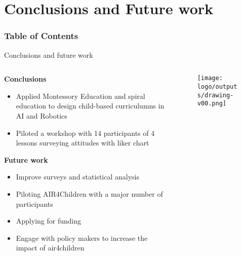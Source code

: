 \section{Conclusions and Future work}


\begin{frame}
      \frametitle{Table of Contents}
      \tableofcontents[currentsection]
\end{frame}



{
\begin{frame}{Conclusions and future work}

  \begin{columns}
  \begin{column}{.75\linewidth}

  \textbf{Conclusions}   

  \begin{itemize}
    \item Applied Montessory Education and spiral education to design child-based curriculumns in AI and Robotics
    \item Piloted a workshop with 14 participants of 4 lessons surveying attitudes with liker chart
  \end{itemize}

  \textbf{Future work}
  \begin{itemize}
    \item Improve surveys and statistical analysis
    \item Piloting AIR4Children with a major number of participants 
    \item Applying for funding 
    \item Engage with policy makers to increase the impact of air4children
\end{itemize}

    \end{column}


  \begin{column}{.3\linewidth}

      \begin{figure}
        \centering
        \texttt{[image: logo/outputs/drawing-v00.png]}
      \end{figure}

    \end{column}
  \end{columns}

\end{frame}
}


%
%
%

